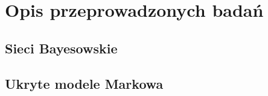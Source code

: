 \newpage

\section{Opis przeprowadzonych badań}

\subsection{Sieci Bayesowskie}

\newpage

\subsection{Ukryte modele Markowa}
